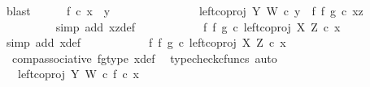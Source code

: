 \begin{isabellebody}
\ blast\isanewline
\ \ \ \ \isamarkupfalse%
\ {\isachardoublequoteopen}f\ {\isasymcirc}\isactrlsub c\ x\ {\isacharequal}{\kern0pt}\ y{\isachardoublequoteclose}\isanewline
\ \ \ \ \isamarkupfalse%
\ {\isacharminus}{\kern0pt}\ \isanewline
\ \ \ \ \ \ \isamarkupfalse%
\ {\isachardoublequoteopen}left{\isacharunderscore}{\kern0pt}coproj\ Y\ W\ {\isasymcirc}\isactrlsub c\ y\ {\isacharequal}{\kern0pt}\ {\isacharparenleft}{\kern0pt}f\ {\isasymbowtie}\isactrlsub f\ g{\isacharparenright}{\kern0pt}\ {\isasymcirc}\isactrlsub c\ xz{\isachardoublequoteclose}\isanewline
\ \ \ \ \ \ \ \ \isamarkupfalse%
\ {\isacharparenleft}{\kern0pt}simp\ add{\isacharcolon}{\kern0pt}\ xz{\isacharunderscore}{\kern0pt}def{\isacharparenright}{\kern0pt}\isanewline
\ \ \ \ \ \ \isamarkupfalse%
\ \isamarkupfalse%
\ {\isachardoublequoteopen}{\isachardot}{\kern0pt}{\isachardot}{\kern0pt}{\isachardot}{\kern0pt}\ {\isacharequal}{\kern0pt}\ {\isacharparenleft}{\kern0pt}f\ {\isasymbowtie}\isactrlsub f\ g{\isacharparenright}{\kern0pt}\ {\isasymcirc}\isactrlsub c\ left{\isacharunderscore}{\kern0pt}coproj\ X\ Z\ {\isasymcirc}\isactrlsub c\ x{\isachardoublequoteclose}\isanewline
\ \ \ \ \ \ \ \ \isamarkupfalse%
\ {\isacharparenleft}{\kern0pt}simp\ add{\isacharcolon}{\kern0pt}\ x{\isacharunderscore}{\kern0pt}def{\isacharparenright}{\kern0pt}\isanewline
\ \ \ \ \ \ \isamarkupfalse%
\ \isamarkupfalse%
\ {\isachardoublequoteopen}{\isachardot}{\kern0pt}{\isachardot}{\kern0pt}{\isachardot}{\kern0pt}\ {\isacharequal}{\kern0pt}\ {\isacharparenleft}{\kern0pt}{\isacharparenleft}{\kern0pt}f\ {\isasymbowtie}\isactrlsub f\ g{\isacharparenright}{\kern0pt}\ {\isasymcirc}\isactrlsub c\ left{\isacharunderscore}{\kern0pt}coproj\ X\ Z{\isacharparenright}{\kern0pt}\ {\isasymcirc}\isactrlsub c\ x{\isachardoublequoteclose}\isanewline
\ \ \ \ \ \ \ \ \isamarkupfalse%
\ \ comp{\isacharunderscore}{\kern0pt}associative{}\ fg{\isacharunderscore}{\kern0pt}type\ x{\isacharunderscore}{\kern0pt}def\ \isamarkupfalse%
\ {\isacharparenleft}{\kern0pt}typecheck{\isacharunderscore}{\kern0pt}cfuncs{\isacharcomma}{\kern0pt}\ auto{\isacharparenright}{\kern0pt}\isanewline
\ \ \ \ \ \ \isamarkupfalse%
\ \isamarkupfalse%
\ {\isachardoublequoteopen}{\isachardot}{\kern0pt}{\isachardot}{\kern0pt}{\isachardot}{\kern0pt}\ {\isacharequal}{\kern0pt}\ {\isacharparenleft}{\kern0pt}left{\isacharunderscore}{\kern0pt}coproj\ Y\ W\ {\isasymcirc}\isactrlsub c\ f{\isacharparenright}{\kern0pt}\ {\isasymcirc}\isactrlsub c\ x{\isachardoublequoteclose}\isanewline

\end{isabellebody}
